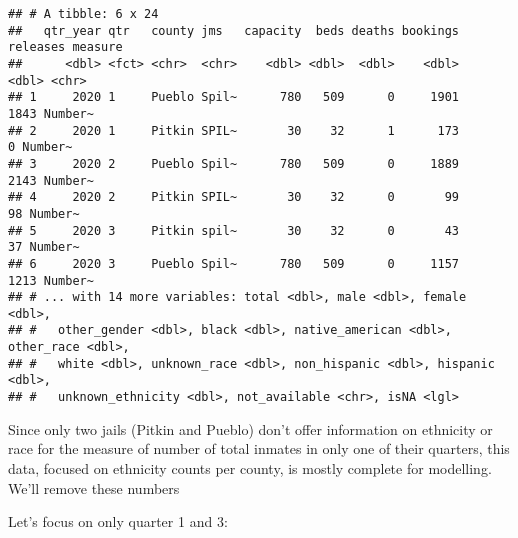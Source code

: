 \documentclass[
]{article}
\newenvironment{Shaded}{\begin{snugshade}}{\end{snugshade}}
\newcommand{\DecValTok}[1]{\textcolor[rgb]{0.00,0.00,0.81}{#1}}
\newcommand{\KeywordTok}[1]{\textcolor[rgb]{0.13,0.29,0.53}{\textbf{#1}}}
\newcommand{\NormalTok}[1]{#1}
\newcommand{\OperatorTok}[1]{\textcolor[rgb]{0.81,0.36,0.00}{\textbf{#1}}}
\newcommand{\StringTok}[1]{\textcolor[rgb]{0.31,0.60,0.02}{#1}}
\begin{document}
\begin{verbatim}
## # A tibble: 6 x 24
##   qtr_year qtr   county jms   capacity  beds deaths bookings releases measure
##      <dbl> <fct> <chr>  <chr>    <dbl> <dbl>  <dbl>    <dbl>    <dbl> <chr>  
## 1     2020 1     Pueblo Spil~      780   509      0     1901     1843 Number~
## 2     2020 1     Pitkin SPIL~       30    32      1      173        0 Number~
## 3     2020 2     Pueblo Spil~      780   509      0     1889     2143 Number~
## 4     2020 2     Pitkin SPIL~       30    32      0       99       98 Number~
## 5     2020 3     Pitkin spil~       30    32      0       43       37 Number~
## 6     2020 3     Pueblo Spil~      780   509      0     1157     1213 Number~
## # ... with 14 more variables: total <dbl>, male <dbl>, female <dbl>,
## #   other_gender <dbl>, black <dbl>, native_american <dbl>, other_race <dbl>,
## #   white <dbl>, unknown_race <dbl>, non_hispanic <dbl>, hispanic <dbl>,
## #   unknown_ethnicity <dbl>, not_available <chr>, isNA <lgl>
\end{verbatim}

Since only two jails (Pitkin and Pueblo) don't offer information on
ethnicity or race for the measure of number of total inmates in only one
of their quarters, this data, focused on ethnicity counts per county, is
mostly complete for modelling. We'll remove these numbers

Let's focus on only quarter 1 and 3:

\begin{Shaded}
\end{Shaded}
\end{document}
